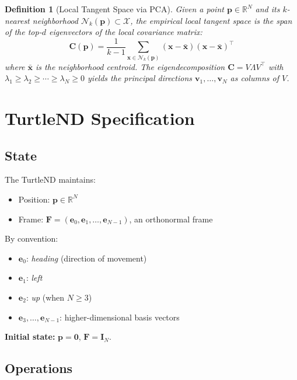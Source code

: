 \documentclass[11pt,letterpaper]{article}
\newtheorem{definition}{Definition}[section]
\newcommand{\R}{\mathbb{R}}
\newcommand{\fr}{\mathbf{F}}
\newcommand{\pos}{\mathbf{p}}
\newcommand{\basis}{\mathbf{e}}
\newcommand{\cov}{\mathbf{C}}
\newcommand{\eye}{\mathbf{I}}
\begin{document}
\begin{definition}[Local Tangent Space via PCA]
\label{def:tangent}
Given a point $\pos \in \R^N$ and its $k$-nearest neighborhood
$\mathcal{N}_k(\pos) \subset \mathcal{X}$, the \emph{empirical local
tangent space} is the span of the top-$d$ eigenvectors of the local
covariance matrix:
\begin{equation}
  \cov(\pos) = \frac{1}{k-1} \sum_{\mathbf{x} \in \mathcal{N}_k(\pos)} (\mathbf{x} - \bar{\mathbf{x}})(\mathbf{x} - \bar{\mathbf{x}})^\top
\end{equation}
where $\bar{\mathbf{x}}$ is the neighborhood centroid. The eigendecomposition
$\cov = V \Lambda V^\top$ with $\lambda_1 \geq \lambda_2 \geq \cdots \geq \lambda_N \geq 0$
yields the principal directions $\mathbf{v}_1, \ldots, \mathbf{v}_N$ as
columns of $V$.
\end{definition}

\section{TurtleND Specification}
\label{sec:turtlend}

\subsection{State}

The TurtleND maintains:
\begin{itemize}[nosep]
  \item Position: $\pos \in \R^N$
  \item Frame: $\fr = (\basis_0, \basis_1, \ldots, \basis_{N-1})$, an orthonormal frame
\end{itemize}

By convention:
\begin{itemize}[nosep]
  \item $\basis_0$: \emph{heading} (direction of movement)
  \item $\basis_1$: \emph{left}
  \item $\basis_2$: \emph{up} (when $N \geq 3$)
  \item $\basis_3, \ldots, \basis_{N-1}$: higher-dimensional basis vectors
\end{itemize}

\noindent\textbf{Initial state:} $\pos = \mathbf{0}$, $\fr = \eye_N$.

\subsection{Operations}
\end{document}
